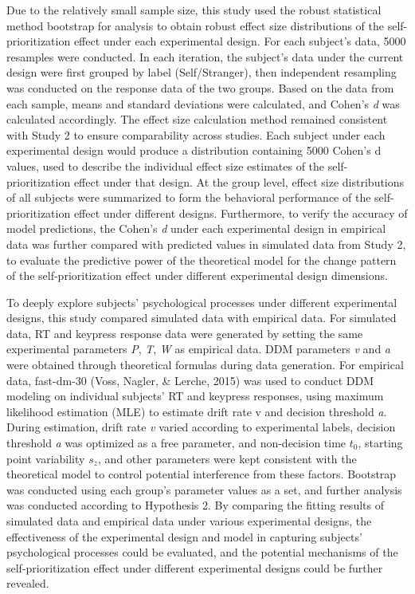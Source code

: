 \documentclass[
  english,
  man,floatsintext]{apa6}
\begin{document}
Due to the relatively small sample size, this study used the robust statistical method bootstrap for analysis to obtain robust effect size distributions of the self-prioritization effect under each experimental design. For each subject's data, 5000 resamples were conducted. In each iteration, the subject's data under the current design were first grouped by label (Self/Stranger), then independent resampling was conducted on the response data of the two groups. Based on the data from each sample, means and standard deviations were calculated, and Cohen's \emph{d} was calculated accordingly. The effect size calculation method remained consistent with Study 2 to ensure comparability across studies. Each subject under each experimental design would produce a distribution containing 5000 Cohen's d values, used to describe the individual effect size estimates of the self-prioritization effect under that design. At the group level, effect size distributions of all subjects were summarized to form the behavioral performance of the self-prioritization effect under different designs. Furthermore, to verify the accuracy of model predictions, the Cohen's \emph{d} under each experimental design in empirical data was further compared with predicted values in simulated data from Study 2, to evaluate the predictive power of the theoretical model for the change pattern of the self-prioritization effect under different experimental design dimensions.

To deeply explore subjects' psychological processes under different experimental designs, this study compared simulated data with empirical data. For simulated data, RT and keypress response data were generated by setting the same experimental parameters \emph{P}, \emph{T}, \emph{W} as empirical data. DDM parameters \emph{v} and \emph{a} were obtained through theoretical formulas during data generation. For empirical data, fast-dm-30 (Voss, Nagler, \& Lerche, 2015) was used to conduct DDM modeling on individual subjects' RT and keypress responses, using maximum likelihood estimation (MLE) to estimate drift rate v and decision threshold \emph{a}. During estimation, drift rate \emph{v} varied according to experimental labels, decision threshold \emph{a} was optimized as a free parameter, and non-decision time \(t_0\), starting point variability \(s_z\), and other parameters were kept consistent with the theoretical model to control potential interference from these factors. Bootstrap was conducted using each group's parameter values as a set, and further analysis was conducted according to Hypothesis 2. By comparing the fitting results of simulated data and empirical data under various experimental designs, the effectiveness of the experimental design and model in capturing subjects' psychological processes could be evaluated, and the potential mechanisms of the self-prioritization effect under different experimental designs could be further revealed.
\end{document}
